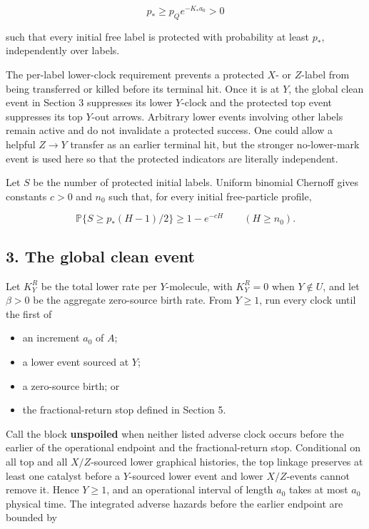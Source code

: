 \[
 p_*\ge p_Qe^{-K_*a_0}>0                              \tag{2.5}
\]

such that every initial free label is protected with probability at
least \(p_*\), independently over labels.

The per-label lower-clock requirement prevents a protected \(X\)- or
\(Z\)-label from being transferred or killed before its terminal hit.
Once it is at \(Y\), the global clean event in Section 3 suppresses its
lower \(Y\)-clock and the protected top event suppresses its top
\(Y\)-out arrows. Arbitrary lower events involving other labels remain
active and do not invalidate a protected success. One could allow a
helpful \(Z\to Y\) transfer as an earlier terminal hit, but the stronger
no-lower-mark event is used here so that the protected indicators are
literally independent.

Let \(S\) be the number of protected initial labels. Uniform binomial
Chernoff gives constants \(c>0\) and \(n_0\) such that, for every
initial free-particle profile,

\[
             \mathbb P\{S\ge p_*(H-1)/2\}\ge1-e^{-cH}
             \qquad(H\ge n_0).                       \tag{2.6}
\]

\subsection{3. The global clean event}

Let \(K_Y^R\) be the total lower rate per \(Y\)-molecule, with
\(K_Y^R=0\) when \(Y\notin U\), and let \(\beta>0\) be the aggregate
zero-source birth rate. From \(Y\ge1\), run every clock until the first
of

\begin{itemize}
\tightlist
\item
  an increment \(a_0\) of \(A\);
\item
  a lower event sourced at \(Y\);
\item
  a zero-source birth; or
\item
  the fractional-return stop defined in Section 5.
\end{itemize}

Call the block \textbf{unspoiled} when neither listed adverse clock
occurs before the earlier of the operational endpoint and the
fractional-return stop. Conditional on all top and all \(X/Z\)-sourced
lower graphical histories, the top linkage preserves at least one
catalyst before a \(Y\)-sourced lower event and lower \(X/Z\)-events
cannot remove it. Hence \(Y\ge1\), and an operational interval of length
\(a_0\) takes at most \(a_0\) physical time. The integrated adverse
hazards before the earlier endpoint are bounded by

